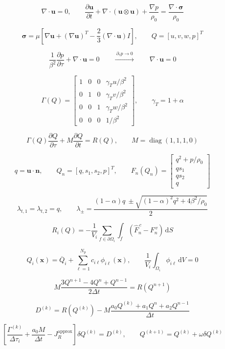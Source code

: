 \documentclass[12pt]{article}
\newcommand{\eqpage}[1]{\begin{center}\fontsize{28}{36}\selectfont #1\end{center}\newpage}
\begin{document}
\eqpage{\[\nabla\!\cdot\bm u=0,\qquad
\frac{\partial\bm u}{\partial t}+\nabla\!\cdot(\bm u\otimes\bm u)
+\frac{\nabla p}{\rho_0}=\frac{\nabla\!\cdot\bm\sigma}{\rho_0}\]}
\eqpage{\[\bm\sigma=\mu\!\left[\nabla\bm u+(\nabla\bm u)^T
-\frac{2}{3}(\nabla\!\cdot\bm u)I\right],\qquad
Q=[u,v,w,p]^T\]}
\eqpage{\[\frac{1}{\beta^2}\frac{\partial p}{\partial\tau}
+\nabla\!\cdot\bm u=0\qquad
\xrightarrow{\ \partial_\tau p\to0\ }\qquad\nabla\!\cdot\bm u=0\]}
\eqpage{\[\Gamma(Q)=
\begin{bmatrix}
1&0&0&\gamma_T u/\beta^2\\
0&1&0&\gamma_T v/\beta^2\\
0&0&1&\gamma_T w/\beta^2\\
0&0&0&1/\beta^2
\end{bmatrix},\qquad
\gamma_T=1+\alpha\]}
\eqpage{\[\Gamma(Q)\frac{\partial Q}{\partial\tau}
+M\frac{\partial Q}{\partial t}=R(Q),\qquad
M=\operatorname{diag}(1,1,1,0)\]}
\eqpage{\[q=\bm u\cdot\bm n,\qquad
Q_n=[q,s_1,s_2,p]^T,\qquad
F_n(Q_n)=\begin{bmatrix}q^2+p/\rho_0\\qs_1\\qs_2\\q\end{bmatrix}\]}
\eqpage{\[\lambda_{t,1}=\lambda_{t,2}=q,\qquad
\lambda_\pm=\frac{(1-\alpha)q\ \pm\sqrt{(1-\alpha)^2q^2+4\beta^2/\rho_0}}{2}\]}
\eqpage{\[R_i(Q)=-\frac{1}{V_i}\sum_{f\in\partial\Omega_i}
\int_f\left(\widehat F_n^{\,c}-F_n^{\,v}\right)\,\mathrm dS\]}
\eqpage{\[Q_i(\bm x)=\overline Q_i+\sum_{\ell=1}^{N_p}
c_{i\ell}\phi_{i\ell}(\bm x),\qquad
\frac{1}{V_i}\int_{\Omega_i}\phi_{i\ell}\,\mathrm dV=0\]}
\eqpage{\[M\frac{3Q^{n+1}-4Q^n+Q^{n-1}}{2\Delta t}=R(Q^{n+1})\]}
\eqpage{\[D^{(k)}=R(Q^{(k)})-
M\frac{a_0Q^{(k)}+a_1Q^n+a_2Q^{n-1}}{\Delta t}\]}
\eqpage{\[\left[\frac{\Gamma^{(k)}}{\Delta\tau_i}
+\frac{a_0M}{\Delta t}-J_R^{\mathrm{approx}}\right]\delta Q^{(k)}=D^{(k)},
\qquad Q^{(k+1)}=Q^{(k)}+\omega\delta Q^{(k)}\]}
\end{document}
